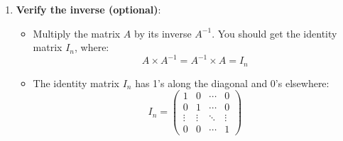 \begin{process}
\begin{enumerate}
        \item \textbf{Verify the inverse (optional)}:
        \begin{itemize}
            \item Multiply the matrix \( A \) by its inverse \( A^{-1} \). You should get the identity matrix \( I_n \), where:
            \[
            A \times A^{-1} = A^{-1} \times A = I_n
            \]
            \item The identity matrix \( I_n \) has 1's along the diagonal and 0's elsewhere:
            \[
            I_n = \begin{pmatrix}
            1 & 0 & \cdots & 0 \\
            0 & 1 & \cdots & 0 \\
            \vdots & \vdots & \ddots & \vdots \\
            0 & 0 & \cdots & 1
            \end{pmatrix}
            \]
        \end{itemize}
        
    \end{enumerate}
\end{process}


